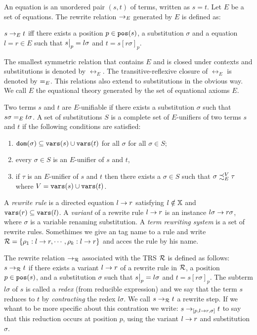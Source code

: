 An equation is an unordered pair $(s,t)$ of terms, written as $s = t$. Let $E$ be a set of equations. The rewrite relation $\rightarrow_E$ generated by $E$ is defined as:
\begin{center}
    $s \rightarrow_E t$ iff there exists a position $p \in \mathtt{pos}(s)$, a substitution $\sigma$ and a equation $l = r \in E$ such that \newline
    $\restr{s}{p} = l \sigma$ and $t = s[r\sigma]_p$.
\end{center}

The smallest symmetric relation that contains $E$ and is closed under contexts and substitutions is denoted by $\leftrightarrow_E$. The transitive-reflexive closure of $\leftrightarrow_E$ is denoted by $\eqUnif{E}$. This relations also extend to substitutions in the obvious way. We call $E$ the equational theory generated by the set of equational axioms $E$.

Two terms $s$ and $t$ are $E$-unifiable if there exists a substitution $\sigma$ such that $s\sigma \eqUnif{E} t\sigma$. A set of substitutions $S$ is a complete set of $E$-unifiers of two terms $s$ and $t$ if the following conditions are satisfied:
\begin{enumerate}
    \item $\mathtt{dom}(\sigma) \subseteq \mathtt{vars}(s) \cup \mathtt{vars}(t)$ for all $\sigma$ for all $\sigma \in S$;
    \item every $\sigma \in S$ is an $E$-unifier of $s$ and $t$,
    \item if $\tau$ is an $E$-unifier of $s$ and $t$ then there exists a $\sigma \in S$ such that $\sigma \iqoless[E][V] \tau$ where $V = \mathtt{vars}(s) \cup \mathtt{vars}(t)$.
\end{enumerate}

A \textit{rewrite rule} is a directed equation $l \rightarrow r$ satisfying $l \notin \mathbb{X}$ and $\mathtt{vars}(r) \subseteq \mathtt{vars}(l)$. A \textit{variant} of a rewrite rule $l \rightarrow r$ is an instance $l \sigma \rightarrow r \sigma$, where $\sigma$ is a variable renaming substitution. A \textit{term rewriting system} is a set of rewrite rules. Somethimes we give an tag name to a rule and write $\mathcal{R} = \{ \rho_1 : l \rightarrow r, \cdots, \rho_k : l \rightarrow r \}$ and acces the rule by his name.

The rewrite relation $\rightarrow_{\mathcal{R}}$ associated with the TRS $\mathcal{R}$ is defined as follows: $s \rightarrow_{\mathcal{R}} t$ if there exists a variant $l \rightarrow r$ of a rewrite rule in $\mathcal{R}$, a position $p \in \mathtt{pos}(s)$, and a substitution $\sigma$ such that $\restr{s}{p} = l \sigma$ and $t = s[r \sigma]_p$. The subterm $l\sigma$ of $s$ is called a \textit{redex} (from reducible expression) and we say that the term $s$ reduces to $t$ by \textit{contracting} the redex $l \sigma$. We call $s \rightarrow_{\mathcal{R}} t$ a rewrite step. If we whant to be more specific about this contration we write: $s \rightarrow_{[p, l \rightarrow r, \sigma]}t$ to say that this reduction occurs at position $p$, using the variant $l \rightarrow r$ and substitution $\sigma$.

